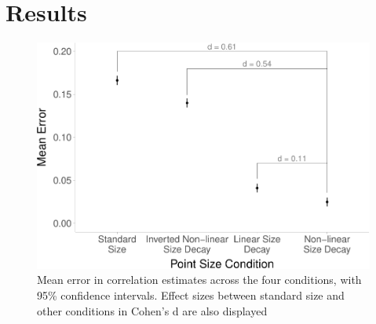\documentclass{vgtc}                          %
\begin{document}
\hypertarget{results}{%
\section{Results}\label{results}}

\begin{figure}
\includegraphics[width=1\linewidth]{size_and_scatterplots_files/figure-latex/dot-plot-1} \caption{Mean error in correlation estimates across the four conditions, with 95\% confidence intervals. Effect sizes between standard size and other conditions in Cohen's d are also displayed}\label{fig:dot-plot}
\end{figure}

\begin{table}

\caption{\label{tab:contrasts-table}Contrasts between the four levels of the size decay condition.}
\centering
{}
\end{table}
\end{document}
